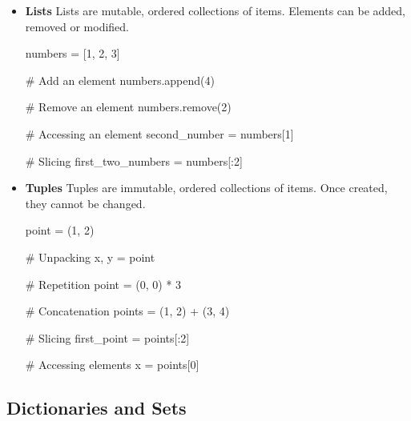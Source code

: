 \begin{itemize}
    \item \textbf{Lists}
    Lists are mutable, ordered collections of items. Elements can be added, removed or modified.
    \begin{exampleblock}
    \begin{codeblock}[language=python]
numbers = [1, 2, 3]

# Add an element
numbers.append(4)

# Remove an element
numbers.remove(2)

# Accessing an element
second_number = numbers[1]

# Slicing
first_two_numbers = numbers[:2]
    \end{codeblock}
    \end{exampleblock}
    \item \textbf{Tuples}
    Tuples are immutable, ordered collections of items. Once created, they cannot be changed.
    \begin{exampleblock}
    \begin{codeblock}[language=python]
point = (1, 2)

# Unpacking
x, y = point

# Repetition
point = (0, 0) * 3

# Concatenation
points = (1, 2) + (3, 4)

# Slicing
first_point = points[:2]

# Accessing elements
x = points[0]
    \end{codeblock}
    \end{exampleblock}
\end{itemize}


\subsection{Dictionaries and Sets}

